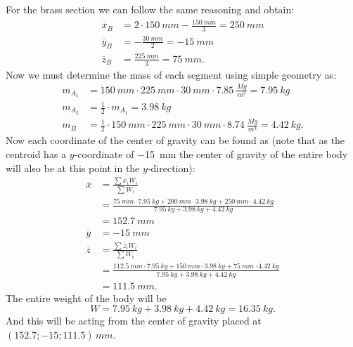 \documentclass[a4paper]{article}
\begin{document}
For the brass section we can follow the same reasoning and obtain:
\begin{align*}
  \overline{x}_{B} &= 2 \cdot \qty{150}{mm} - \frac{\qty{150}{mm} }{3} = \qty{250}{mm}  \\
  \overline{y}_B &= -\frac{\qty{30}{mm} }{2} = - \qty{15}{mm}   \\
  \overline{z}_B &= \frac{\qty{225}{mm} }{3} = \qty{75}{mm}
.\end{align*}
Now we must determine the mass of each segment using simple geometry as:
\begin{align*}
  m_{A_1} &= \qty{150}{mm} \cdot \qty{225}{mm} \cdot \qty{30}{mm} \cdot \qty{7,85}{\frac{Mg}{m^3}} = \qty{7,95}{kg}  \\
  m_{A_2} &= \frac{1}{2} \cdot m_{A_1} = \qty{3,98}{kg} \\
  m_{B} &= \frac{1}{2} \cdot \qty{150}{mm} \cdot \qty{225}{mm} \cdot \qty{30}{mm} \cdot \qty{8,74}{\frac{Mg}{m^3}} = \qty{4,42}{kg}
.\end{align*}
Now each coordinate of the center of gravity can be found as (note that as the centroid has a $y$-coordinate of \qty{-15}{mm} the center of gravity of the entire body will also be at this point in the $y$-direction):
\begin{align*}
  \overline{x} &= \frac{\sum \overline{x}_i W_i}{\sum W_i} \\
  &= \frac{\qty{75}{mm} \cdot \qty{7,95}{kg} + \qty{200}{mm} \cdot \qty{3,98}{kg} + \qty{250}{mm} \cdot \qty{4,42}{kg} }{\qty{7.95}{kg} + \qty{3,98}{kg} + \qty{4,42}{kg} } \\
  &= \qty{152,7}{mm} \\
  \overline{y} &= -\qty{15}{mm} \\
  \overline{z} &= \frac{\sum \overline{z}_i W_i}{\sum W_i} \\
  &= \frac{\qty{112,5}{mm} \cdot \qty{7,95}{kg} + \qty{150}{mm} \cdot \qty{3,98}{kg} + \qty{75}{mm} \cdot \qty{4,42}{kg} }{\qty{7,95}{kg} + \qty{3,98}{kg} + \qty{4,42}{kg} } \\
  &= \qty{111,5}{mm}
.\end{align*}
The entire weight of the body will be
\[ 
W = \qty{7,95}{kg} + \qty{3,98}{kg} + \qty{4,42}{kg} = \qty{16,35}{kg} 
.\]
And this will be acting from the center of gravity placed at $(\num{152,7}; \num{-15}; \num{111,5}) \, \unit{mm}$.
\end{document}

